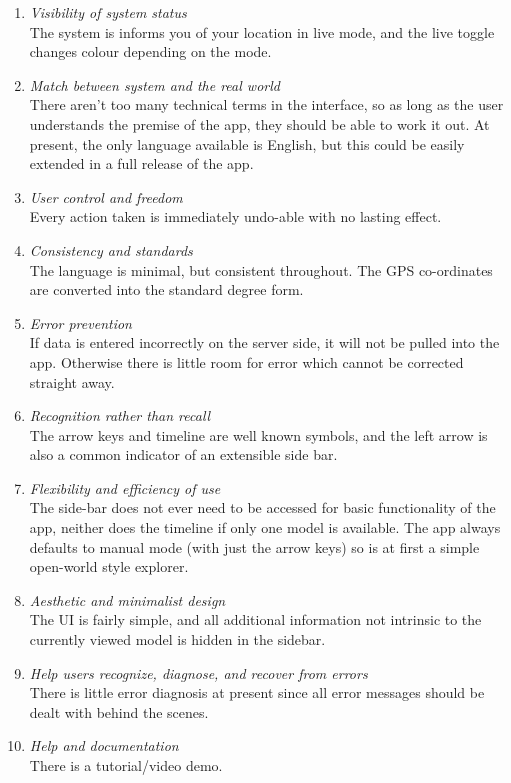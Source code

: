 \documentclass{article}
\begin{document}
\begin{enumerate}
    \item \textit{Visibility of system status} \\
    The system is informs you of your location in live mode, and the live toggle changes colour depending on the mode.
    \item \textit{Match between system and the real world} \\
    There aren't too many technical terms in the interface, so as long as the user understands the premise of the app, they should be able to work it out. At present, the only language available is English, but this could be easily extended in a full release of the app. 
    \item \textit{User control and freedom} \\
    Every action taken is immediately undo-able with no lasting effect.
    \item \textit{Consistency and standards} \\
    The language is minimal, but consistent throughout. The GPS co-ordinates are converted into the standard degree form.
    \item \textit{Error prevention} \\
    If data is entered incorrectly on the server side, it will not be pulled into the app. Otherwise there is little room for error which cannot be corrected straight away.
    \item \textit{Recognition rather than recall} \\
    The arrow keys and timeline are well known symbols, and the left arrow is also a common indicator of an extensible side bar.
    \item \textit{Flexibility and efficiency of use} \\
    The side-bar does not ever need to be accessed for basic functionality of the app, neither does the timeline if only one model is available. The app always defaults to manual mode (with just the arrow keys) so is at first a simple open-world style explorer.
    \item \textit{Aesthetic and minimalist design} \\
    The UI is fairly simple, and all additional information not intrinsic to the currently viewed model is hidden in the sidebar.
    \item \textit{Help users recognize, diagnose, and recover from errors} \\
    There is little error diagnosis at present since all error messages should be dealt with behind the scenes.
    \item \textit{Help and documentation} \\
    There is a tutorial/video demo. \cite{design:videodemo}
\end{enumerate}
\end{document}
